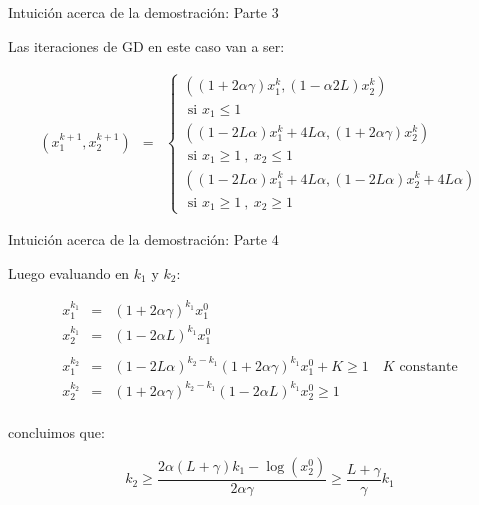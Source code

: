 \documentclass{beamer}
\begin{document}
\begin{frame}{Intuici\'on acerca de la demostraci\'on: Parte 3}
	
Las iteraciones de GD en este caso van a ser:
	
	\begin{equation*}
	\begin{array}{rcl}
	\left(x_1^{k+1}, x^{k+1}_2\right) & =  &\left\lbrace\begin{array}{c}
	\left(\left(1 + 2\alpha \gamma \right)x^k_1, \left(1 - \alpha 2L\right)x^k_2\right) \\ \text{ si } x_1 \leq 1\\
	\left(\left(1 - 2L \alpha \right)x^k_1 + 4L \alpha, \left(1 + 2 \alpha \gamma \right)x^k_2\right) \\ \text{ si } x_1 \geq 1 \ , \ x_2 \leq 1 \\
	\left(\left(1 - 2L \alpha \right)x^k_1 + 4L \alpha, \left(1 - 2L \alpha \right)x^k_2 + 4L \alpha\right)  \\ \text{ si } x_1 \geq 1 \ , \ x_2 \geq 1
	\end{array}\right.
	\end{array}
	\end{equation*}
	
	\end{frame}
\begin{frame}{Intuici\'on acerca de la demostraci\'on: Parte 4}
	
	Luego evaluando en $k_1$ y $k_2$:
	
	\begin{equation*}
	\begin{array}{rcl}
	x^{k_1}_1 & = & \left(1 + 2 \alpha \gamma\right)^{k_1} x^0_1 \\
	x^{k_1}_2 & = & \left(1 - 2 \alpha L\right)^{k_1} x^0_1 \\
	&&\\
	x^{k_2}_1 & = & \left(1 - 2L\alpha\right)^{k_2 - k_1}\left(1 + 2 \alpha \gamma\right)^{k_1} x^0_1 + K\geq 1 \quad K \text{ constante}\\
	x^{k_2}_2 & = & \left(1 + 2 \alpha \gamma\right)^{k_2-k_1}\left(1 - 2 \alpha L\right)^{k_1} x^0_2\geq 1 \\
	\end{array}
	\end{equation*}
	
	\medskip
	
	concluimos que:
	
	\medskip
	\begin{equation*}
	k_2 \geq \dfrac{2 \alpha \left(L + \gamma\right)k_1 - \log\left(x_2^0\right)}{2 \alpha \gamma} \geq \dfrac{L + \gamma}{\gamma} k_1 
	\end{equation*}
	
	\end{frame}
	
\end{document}
